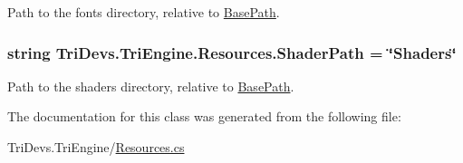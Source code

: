 Path to the fonts directory, relative to \hyperlink{class_tri_devs_1_1_tri_engine_1_1_resources_af47b8cda82cb2fc89cedbd8546997e77}{Base\-Path}. 

\hypertarget{class_tri_devs_1_1_tri_engine_1_1_resources_a12c789a4eefef5dd60c990aa1efd2915}{
\subsubsection[{Shader\-Path}]{\setlength{\rightskip}{0pt plus 5cm}string Tri\-Devs.\-Tri\-Engine.\-Resources.\-Shader\-Path = \char`\"{}Shaders\char`\"{}\hspace{0.3cm}{\ttfamily [static]}}}\label{class_tri_devs_1_1_tri_engine_1_1_resources_a12c789a4eefef5dd60c990aa1efd2915}


Path to the shaders directory, relative to \hyperlink{class_tri_devs_1_1_tri_engine_1_1_resources_af47b8cda82cb2fc89cedbd8546997e77}{Base\-Path}. 



The documentation for this class was generated from the following file\-:\begin{DoxyCompactItemize}
\item 
Tri\-Devs.\-Tri\-Engine/\hyperlink{_resources_8cs}{Resources.\-cs}\end{DoxyCompactItemize}
